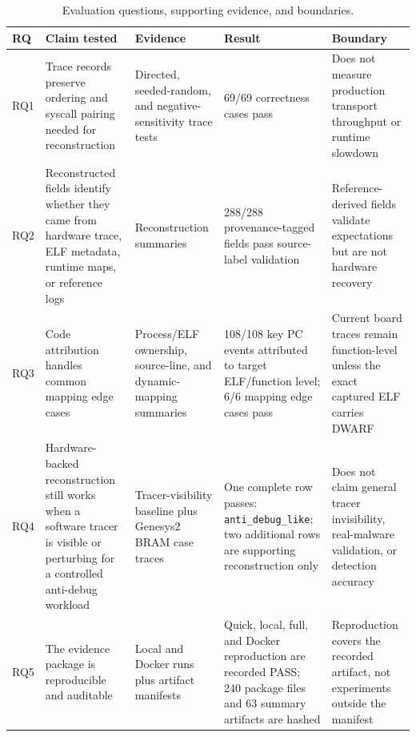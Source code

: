\begin{table}[t]
\centering
\caption{Evaluation questions, supporting evidence, and boundaries.}
\label{tab:evaluation}
\scriptsize
\begin{tabularx}{\textwidth}{p{}p{}p{}p{}Y}
\toprule
RQ & Claim tested & Evidence & Result & Boundary \\
\midrule
RQ1 & Trace records preserve ordering and syscall pairing needed for reconstruction & Directed, seeded-random, and negative-sensitivity trace tests & 69/69 correctness cases pass & Does not measure production transport throughput or runtime slowdown \\
RQ2 & Reconstructed fields identify whether they came from hardware trace, ELF metadata, runtime maps, or reference logs & Reconstruction summaries & 288/288 provenance-tagged fields pass source-label validation & Reference-derived fields validate expectations but are not hardware recovery \\
RQ3 & Code attribution handles common mapping edge cases & Process/ELF ownership, source-line, and dynamic-mapping summaries & 108/108 key PC events attributed to target ELF/function level; 6/6 mapping edge cases pass & Current board traces remain function-level unless the exact captured ELF carries DWARF \\
RQ4 & Hardware-backed reconstruction still works when a software tracer is visible or perturbing for a controlled anti-debug workload & Tracer-visibility baseline plus Genesys2 BRAM case traces & One complete row passes: \texttt{anti\_debug\_like}; two additional rows are supporting reconstruction only & Does not claim general tracer invisibility, real-malware validation, or detection accuracy \\
RQ5 & The evidence package is reproducible and auditable & Local and Docker runs plus artifact manifests & Quick, local, full, and Docker reproduction are recorded PASS; 240 package files and 63 summary artifacts are hashed & Reproduction covers the recorded artifact, not experiments outside the manifest \\
\bottomrule
\end{tabularx}
\end{table}
